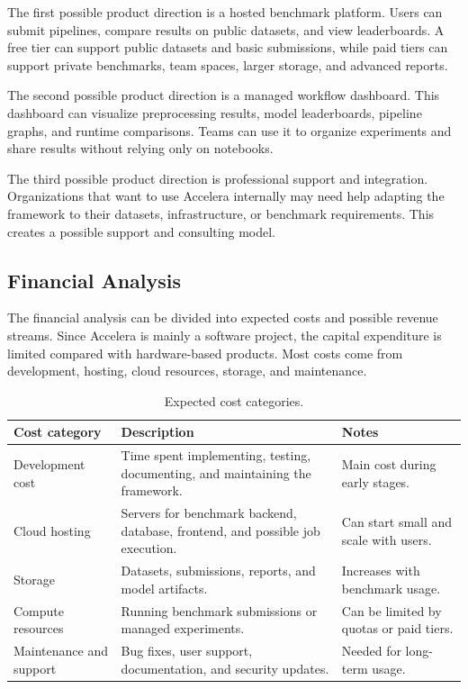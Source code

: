 \documentclass[12pt,a4paper]{report}
\newcommand{\acceleraTableStyle}{%
\small
\renewcommand{\arraystretch}{1.15}
\setlength{\tabcolsep}{4pt}%
}
\begin{document}
The first possible product direction is a hosted benchmark platform. Users can
submit pipelines, compare results on public datasets, and view leaderboards. A
free tier can support public datasets and basic submissions, while paid tiers can
support private benchmarks, team spaces, larger storage, and advanced reports.

The second possible product direction is a managed workflow dashboard. This
dashboard can visualize preprocessing results, model leaderboards, pipeline
graphs, and runtime comparisons. Teams can use it to organize experiments and
share results without relying only on notebooks.

The third possible product direction is professional support and integration.
Organizations that want to use Accelera internally may need help adapting the
framework to their datasets, infrastructure, or benchmark requirements. This
creates a possible support and consulting model.

\subsection{Financial Analysis}

The financial analysis can be divided into expected costs and possible revenue
streams. Since Accelera is mainly a software project, the capital expenditure is
limited compared with hardware-based products. Most costs come from development,
hosting, cloud resources, storage, and maintenance.

\begin{table}[!htbp]
\centering
\acceleraTableStyle
\caption{Expected cost categories.}
\label{tab:expected-costs}
\begin{tabular}{p{}p{}p{}}
\toprule
\textbf{Cost category} & \textbf{Description} & \textbf{Notes} \\
\midrule

Development cost &
Time spent implementing, testing, documenting, and maintaining the framework. &
Main cost during early stages. \\
\midrule

Cloud hosting &
Servers for benchmark backend, database, frontend, and possible job execution. &
Can start small and scale with users. \\
\midrule

Storage &
Datasets, submissions, reports, and model artifacts. &
Increases with benchmark usage. \\
\midrule

Compute resources &
Running benchmark submissions or managed experiments. &
Can be limited by quotas or paid tiers. \\
\midrule

Maintenance and support &
Bug fixes, user support, documentation, and security updates. &
Needed for long-term usage. \\

\bottomrule
\end{tabular}
\end{table}
\end{document}
